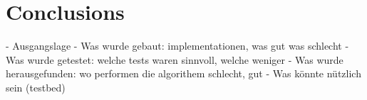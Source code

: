 \chapter{Conclusions}
\label{c:conclusions} 
- Ausgangslage
- Was wurde gebaut: implementationen, was gut was schlecht
- Was wurde getestet: welche tests waren sinnvoll, welche weniger
- Was wurde herausgefunden: wo performen die algorithem schlecht, gut
- Was könnte nützlich sein (testbed)
